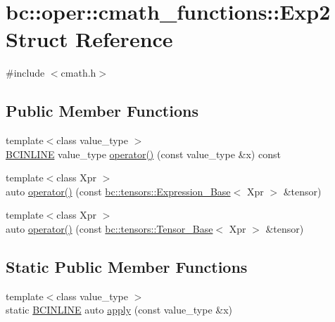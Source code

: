 \hypertarget{structbc_1_1oper_1_1cmath__functions_1_1Exp2}{}\section{bc\+:\+:oper\+:\+:cmath\+\_\+functions\+:\+:Exp2 Struct Reference}
\label{structbc_1_1oper_1_1cmath__functions_1_1Exp2}


{\ttfamily \#include $<$cmath.\+h$>$}

\subsection*{Public Member Functions}
\begin{DoxyCompactItemize}
\item 
{\footnotesize template$<$class value\+\_\+type $>$ }\\\hyperlink{common_8h_a6699e8b0449da5c0fafb878e59c1d4b1}{B\+C\+I\+N\+L\+I\+NE} value\+\_\+type \hyperlink{structbc_1_1oper_1_1cmath__functions_1_1Exp2_a4598fc4ff3324735593095d360c802d1}{operator()} (const value\+\_\+type \&x) const
\item 
{\footnotesize template$<$class Xpr $>$ }\\auto \hyperlink{structbc_1_1oper_1_1cmath__functions_1_1Exp2_a70896393943a5aff6211e50e2f97ed01}{operator()} (const \hyperlink{classbc_1_1tensors_1_1Expression__Base}{bc\+::tensors\+::\+Expression\+\_\+\+Base}$<$ Xpr $>$ \&tensor)
\item 
{\footnotesize template$<$class Xpr $>$ }\\auto \hyperlink{structbc_1_1oper_1_1cmath__functions_1_1Exp2_aeaa7aadbace6cde23d28de7bebc53d87}{operator()} (const \hyperlink{classbc_1_1tensors_1_1Tensor__Base}{bc\+::tensors\+::\+Tensor\+\_\+\+Base}$<$ Xpr $>$ \&tensor)
\end{DoxyCompactItemize}
\subsection*{Static Public Member Functions}
\begin{DoxyCompactItemize}
\item 
{\footnotesize template$<$class value\+\_\+type $>$ }\\static \hyperlink{common_8h_a6699e8b0449da5c0fafb878e59c1d4b1}{B\+C\+I\+N\+L\+I\+NE} auto \hyperlink{structbc_1_1oper_1_1cmath__functions_1_1Exp2_a06df73a79b1c6e4e74adf06ad6393f12}{apply} (const value\+\_\+type \&x)
\end{DoxyCompactItemize}


